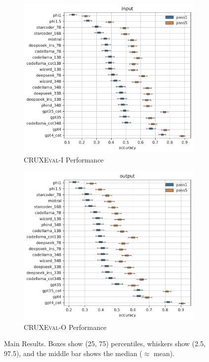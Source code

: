 \documentclass{article}
\newcommand{\benchmarki}{\textsc{CRUXEval-I}\xspace}
\newcommand{\benchmarko}{\textsc{CRUXEval-O}\xspace}
\begin{document}
\begin{figure}[H]
     \centering
     \begin{subfigure}[b]{0.49\textwidth}
         \centering
         \includegraphics[width=\textwidth]{figs/main_results/main_box_input.pdf}
         \caption{\benchmarki Performance}
         \label{fig:main-results-pass1-input}
     \end{subfigure}
     \hfill
     \begin{subfigure}[b]{0.49\textwidth}
         \centering
         \includegraphics[width=\textwidth]{figs/main_results/main_box_output.pdf}
         \caption{\benchmarko Performance}
         \label{fig:main-results-pass1-output}
     \end{subfigure}
     \caption{Main Results. Boxes show (25, 75) percentiles, whiskers show (2.5, 97.5), and the middle bar shows the median ($\approx$ mean). }
     \label{fig:main-results}
\end{figure}
\end{document}

